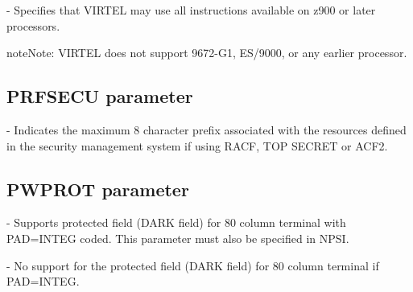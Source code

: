 \documentclass[letterpaper,10pt,english]{sphinxmanual}
\begin{document}
 - Specifies that VIRTEL may use all instructions available on z900 or later processors.

\begin{sphinxadmonition}{note}{Note:}
VIRTEL does not support 9672-G1, ES/9000, or any earlier processor.
\end{sphinxadmonition}

\ignorespaces 

\subsection{PRFSECU parameter}
\label{\detokenize{Installation_Guide:prfsecu-parameter}}\label{\detokenize{Installation_Guide:index-102}}
\begin{sphinxVerbatim}[commandchars=\\\{\}]
 
\end{sphinxVerbatim}

 - Indicates the maximum 8 character prefix associated with the resources defined in the security management system if using RACF, TOP SECRET or ACF2.

\ignorespaces 

\subsection{PWPROT parameter}
\label{\detokenize{Installation_Guide:pwprot-parameter}}\label{\detokenize{Installation_Guide:index-103}}
\begin{sphinxVerbatim}[commandchars=\\\{\}]
 
\end{sphinxVerbatim}

 - Supports protected field (DARK field) for 80 column terminal with PAD=INTEG coded. This parameter must also be specified in NPSI.

 - No support for the protected field (DARK field) for 80 column terminal if PAD=INTEG.
\end{document}
